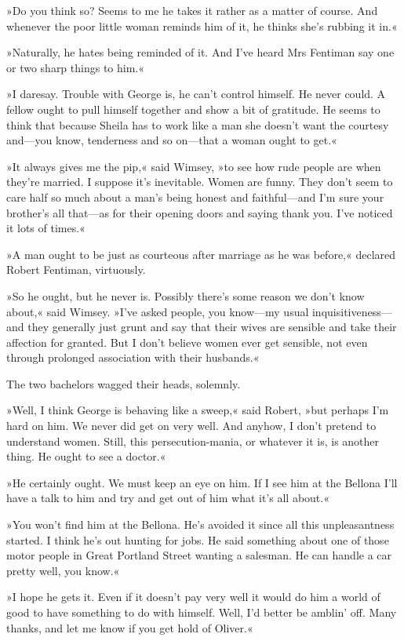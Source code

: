 »Do you think so? Seems to me he takes it rather as a matter of course. And whenever the poor little woman reminds him of it, he thinks she's rubbing it in.«

»Naturally, he hates being reminded of it. And I've heard Mrs Fentiman say one or two sharp things to him.«

»I daresay. Trouble with George is, he can't control himself. He never could. A fellow ought to pull himself together and show a bit of gratitude. He seems to think that because Sheila has to work like a man she doesn't want the courtesy and—you know, tenderness and so on—that a woman ought to get.«

»It always gives me the pip,« said Wimsey, »to see how rude people are when they're married. I suppose it's inevitable. Women are funny. They don't seem to care half so much about a man's being honest and faithful—and I'm sure your brother's all that—as for their opening doors and saying thank you. I've noticed it lots of times.«

»A man ought to be just as courteous after marriage as he was before,« declared Robert Fentiman, virtuously.

»So he ought, but he never is. Possibly there's some reason we don't know about,« said Wimsey. »I've asked people, you know—my usual inquisitiveness—and they generally just grunt and say that their wives are sensible and take their affection for granted. But I don't believe women ever get sensible, not even through prolonged association with their husbands.«

The two bachelors wagged their heads, solemnly.

»Well, I think George is behaving like a sweep,« said Robert, »but perhaps I'm hard on him. We never did get on very well. And anyhow, I don't pretend to understand women. Still, this persecution-mania, or whatever it is, is another thing. He ought to see a doctor.«

»He certainly ought. We must keep an eye on him. If I see him at the Bellona I'll have a talk to him and try and get out of him what it's all about.«

»You won't find him at the Bellona. He's avoided it since all this unpleasantness started. I think he's out hunting for jobs. He said something about one of those motor people in Great Portland Street wanting a salesman. He can handle a car pretty well, you know.«

»I hope he gets it. Even if it doesn't pay very well it would do him a world of good to have something to do with himself. Well, I'd better be amblin' off. Many thanks, and let me know if you get hold of Oliver.«

